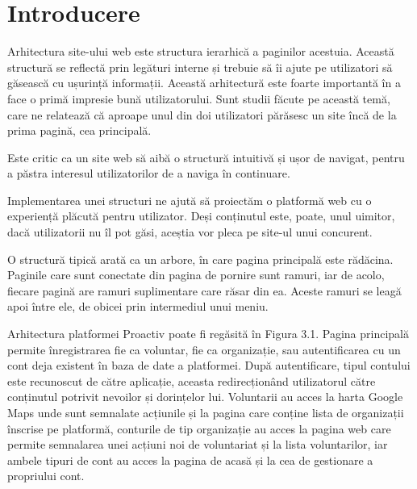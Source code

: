 \documentclass[12pt,a4paper]{report}
\begin{document}
\section{Introducere}
\par
Arhitectura site-ului web este structura ierarhică a paginilor acestuia. Această structură se reflectă prin legături interne și trebuie să îi ajute pe utilizatori să găsească cu ușurință informații. Această arhitectură este foarte importantă în a face o primă impresie bună utilizatorului. Sunt studii făcute pe această temă, care ne relatează că aproape unul din doi utilizatori părăsesc un site încă de la prima pagină, cea principală.
\\\par 
Este critic ca un site web să aibă o structură intuitivă și ușor de navigat, pentru a păstra interesul utilizatorilor de a naviga în continuare.
\\\par 
Implementarea unei structuri ne ajută să proiectăm o platformă web cu o experiență plăcută pentru utilizator. Deși conținutul este, poate, unul uimitor, dacă utilizatorii nu îl pot găsi, aceștia vor pleca pe site-ul unui concurent.
\\\par 
O structură tipică arată ca un arbore, în care pagina principală este rădăcina. Paginile care sunt conectate din pagina de pornire sunt ramuri, iar de acolo, fiecare pagină are ramuri suplimentare care răsar din ea. Aceste ramuri se leagă apoi între ele, de obicei prin intermediul unui meniu.
\\\par 
Arhitectura platformei Proactiv poate fi regăsită în Figura 3.1. Pagina principală permite înregistrarea fie ca voluntar, fie ca organizație, sau autentificarea cu un cont deja existent în baza de date a platformei. După autentificare, tipul contului este recunoscut de către aplicație, aceasta redirecționând utilizatorul către conținutul potrivit nevoilor și dorințelor lui. Voluntarii au acces la harta Google Maps unde sunt semnalate acțiunile și la pagina care conține lista de organizații înscrise pe platformă, conturile de tip organizație au acces la pagina web care permite semnalarea unei acțiuni noi de voluntariat și la lista voluntarilor, iar ambele tipuri de cont au acces la pagina de acasă și la cea de gestionare a propriului cont.
\end{document}
